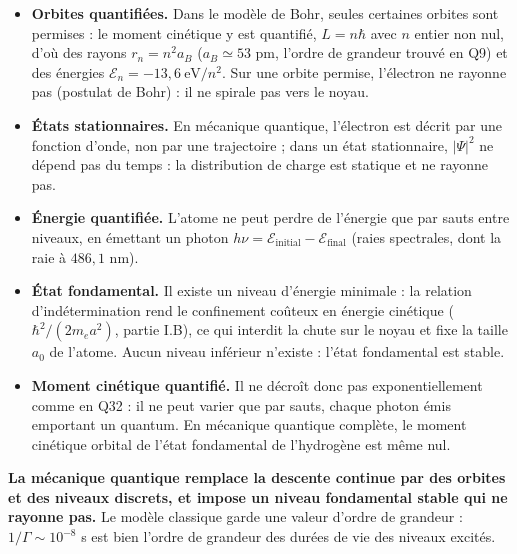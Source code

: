 \documentclass[11pt,a4paper]{article}
\providecommand{\tightlist}{\setlength{\itemsep}{0pt}\setlength{\parskip}{0pt}}
\begin{document}
\begin{itemize}
\tightlist
\item
  \textbf{Orbites quantifiées.} Dans le modèle de Bohr, seules certaines orbites sont permises : le moment cinétique y est quantifié, \(L=n\hbar\) avec \(n\) entier non nul, d'où des rayons \(r_n=n^2a_B\) (\(a_B\simeq53\) pm, l'ordre de grandeur trouvé en Q9) et des énergies \(\mathcal E_n=-13{,}6\ \mathrm{eV}/n^2\). Sur une orbite permise, l'électron ne rayonne pas (postulat de Bohr) : il ne spirale pas vers le noyau.
\item
  \textbf{États stationnaires.} En mécanique quantique, l'électron est décrit par une fonction d'onde, non par une trajectoire ; dans un état stationnaire, \(|\Psi|^2\) ne dépend pas du temps : la distribution de charge est statique et ne rayonne pas.
\item
  \textbf{Énergie quantifiée.} L'atome ne peut perdre de l'énergie que par sauts entre niveaux, en émettant un photon \(h\nu=\mathcal E_{\mathrm{initial}}-\mathcal E_{\mathrm{final}}\) (raies spectrales, dont la raie à \(486{,}1\) nm).
\item
  \textbf{État fondamental.} Il existe un niveau d'énergie minimale : la relation d'indétermination rend le confinement coûteux en énergie cinétique (\(\hbar^2/(2m_ea^2)\), partie I.B), ce qui interdit la chute sur le noyau et fixe la taille \(a_0\) de l'atome. Aucun niveau inférieur n'existe : l'état fondamental est stable.
\item
  \textbf{Moment cinétique quantifié.} Il ne décroît donc pas exponentiellement comme en Q32 : il ne peut varier que par sauts, chaque photon émis emportant un quantum. En mécanique quantique complète, le moment cinétique orbital de l'état fondamental de l'hydrogène est même nul.
\end{itemize}

\textbf{La mécanique quantique remplace la descente continue par des orbites et des niveaux discrets, et impose un niveau fondamental stable qui ne rayonne pas.} Le modèle classique garde une valeur d'ordre de grandeur : \(1/\Gamma\sim10^{-8}\) s est bien l'ordre de grandeur des durées de vie des niveaux excités.
\end{document}

